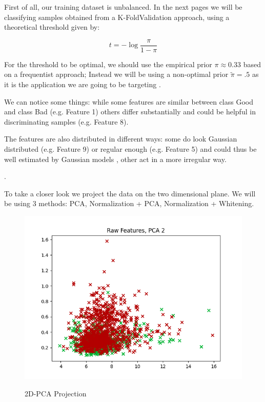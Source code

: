 \documentclass[hidelinks, 12pt, twocolumn]{article}
\begin{document}
First of all, our training dataset is unbalanced. 
In the next pages we will be classifying samples obtained from a K-Fold\footnotemark Validation approach, using a theoretical threshold given by:

$$ t = -\log{\frac{\pi}{1-\pi}} $$

For the threshold to be optimal, we should use the empirical prior $\pi \approx 0.33$ based on a frequentist approach;
Instead we will be using a non-optimal prior $\tilde{\pi} = .5$ as it is the application we are going to be targeting
.

We can notice some things:
while some features are similar between class Good and class Bad (e.g. Feature 1) others differ substantially 
and could be helpful in discriminating samples (e.g. Feature 8).

The features are also distributed in different ways: 
some do look Gaussian distributed (e.g. Feature 9) or regular enough
(e.g. Feature 5) and could thus be well estimated by Gaussian models\footnotemark 
, other act in a more irregular way.

.

To take a closer look we project the data on the two dimensional plane. 
We will be using 3 methods: PCA\footnotemark , Normalization + PCA, Normalization + Whitening.


\begin{figure}[H]     
    {\includegraphics[width=\linewidth]{2DRAW.png}}
    \caption{2D-PCA Projection}
    \label{fig:2DRAW}
\end{figure}
\end{document}
